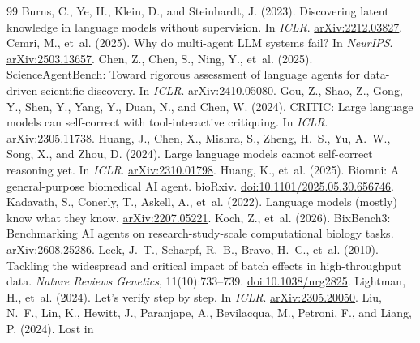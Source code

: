\documentclass[10pt]{article}
\begin{document}
\begin{thebibliography}{99}\setlength{\itemsep}{2pt}\small
{} Burns, C., Ye, H., Klein, D., and Steinhardt, J. (2023). Discovering latent knowledge in language
models without supervision. In \emph{ICLR}. \href{https://arxiv.org/abs/2212.03827}{arXiv:2212.03827}.
 Cemri, M., et~al. (2025). Why do multi-agent LLM systems fail? In \emph{NeurIPS}.
\href{https://arxiv.org/abs/2503.13657}{arXiv:2503.13657}.
 Chen, Z., Chen, S., Ning, Y., et~al. (2025). ScienceAgentBench: Toward rigorous
assessment of language agents for data-driven scientific discovery. In \emph{ICLR}. \href{https://arxiv.org/abs/2410.05080}{arXiv:2410.05080}.
 Gou, Z., Shao, Z., Gong, Y., Shen, Y., Yang, Y., Duan, N., and Chen, W. (2024). CRITIC: Large language
models can self-correct with tool-interactive critiquing. In \emph{ICLR}. \href{https://arxiv.org/abs/2305.11738}{arXiv:2305.11738}.
 Huang, J., Chen, X., Mishra, S., Zheng, H.~S., Yu, A.~W., Song, X., and Zhou, D. (2024). Large
language models cannot self-correct reasoning yet. In \emph{ICLR}. \href{https://arxiv.org/abs/2310.01798}{arXiv:2310.01798}.
 Huang, K., et~al. (2025). Biomni: A general-purpose biomedical AI agent. bioRxiv.
\href{https://doi.org/10.1101/2025.05.30.656746}{doi:10.1101/2025.05.30.656746}.
 Kadavath, S., Conerly, T., Askell, A., et~al. (2022). Language models (mostly) know what
they know. \href{https://arxiv.org/abs/2207.05221}{arXiv:2207.05221}.
 Koch, Z., et~al. (2026). BixBench3: Benchmarking AI agents on research-study-scale computational
biology tasks. \href{https://arxiv.org/abs/2608.25286}{arXiv:2608.25286}.
 Leek, J.~T., Scharpf, R.~B., Bravo, H.~C., et~al. (2010). Tackling the widespread and critical impact of
batch effects in high-throughput data. \emph{Nature Reviews Genetics}, 11(10):733--739. \href{https://doi.org/10.1038/nrg2825}{doi:10.1038/nrg2825}.
 Lightman, H., et~al. (2024). Let's verify step by step. In \emph{ICLR}.
\href{https://arxiv.org/abs/2305.20050}{arXiv:2305.20050}.
 Liu, N.~F., Lin, K., Hewitt, J., Paranjape, A., Bevilacqua, M., Petroni, F., and Liang, P. (2024). Lost in

\end{thebibliography}
\end{document}
